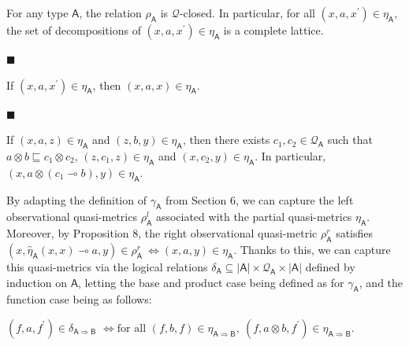 For any type $\mathsf{A}$, the relation $\rho_{\mathsf{A}}$ is $\mathcal{Q}$-closed. In particular, for all $(x,a,x^{\prime})\in\eta_{\mathsf{A}}$, the set of decompositions of $(x,a,x^{\prime})\in\eta_{\mathsf{A}}$ is a complete lattice.\par
 
 
 
\par\noindent  $\blacksquare$ 
 
If $(x,a,x^{\prime})\in\eta_{\mathsf{A}}$, then $(x,a,x)\in\eta_{\mathsf{A}}$.\par
 
 
 
\par\noindent  $\blacksquare$ 
 
If $(x,a,z)\in\eta_{\mathsf{A}}$ and $(z,b,y)\in\eta_{\mathsf{A}}$, then there exists $c_{1},c_{2}\in\mathcal{Q}_{\mathsf{A}}$ such that $a\otimes b\sqsubseteq c_{1}\otimes c_{2}$, $(z,c_{1},z)\in\eta_{\mathsf{A}}$ and $(x,c_{2},y)\in\eta_{\mathsf{A}}$. In particular, $(x,a\otimes(c_{1}\multimap b),y)\in\eta_{\mathsf{A}}$.\par
 
 
  
 
 
 
By adapting the definition of $\gamma_{\mathsf{A}}$ from Section 6, we can capture the left observational quasi-metrics $\rho_{\mathsf{A}}^{l}$ associated with the partial quasi-metrics $\eta_{\mathsf{A}}$. Moreover, by Proposition 8, the right observational quasi-metric $\rho_{\mathsf{A}}^{r}$ satisfies $(x,\widehat{\eta}_{\mathsf{A}}(x,x)\multimap a,y)\in\rho_{\mathsf{A}}^{r}\ %
\iff(x,a,y)\in\eta_{\mathsf{A}}$. Thanks to this, we can capture this quasi-metrics via the logical relations $\delta_{\mathsf{A}}\subseteq|\mathsf{A}|\times\mathcal{Q}_{\mathsf{A}}\times|%
\mathsf{A}|$ defined by induction on $\mathsf{A}$, letting the base and product case being defined as for $\gamma_{\mathsf{A}}$, and the function case being as follows:\par
    $\displaystyle(f,a,f^{\prime})\in\delta_{\mathsf{A}\Rightarrow\mathsf{B}}$ $\displaystyle\iff\text{for all }(f,b,f)\in\eta_{\mathsf{A}\Rightarrow\mathsf{B%
}},\ (f,a\otimes b,f^{\prime})\in\eta_{\mathsf{A}\Rightarrow\mathsf{B}}.$    
 
